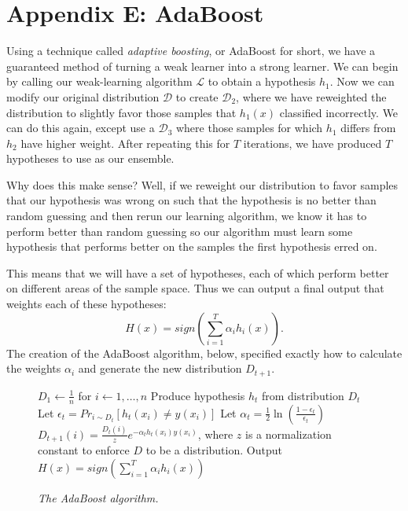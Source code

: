 \documentclass{article}
\newcommand{\LL}{\ensuremath{\mathcal{L}}}
\begin{document}
\section{Appendix E: AdaBoost}
Using a technique called \emph{adaptive boosting}, or AdaBoost for short, we
have a guaranteed method of turning a weak learner into a strong learner. We
can begin by calling our weak-learning algorithm $\LL$ to obtain a hypothesis
$h_1$. Now we can modify our original distribution $\mathcal{D}$ to create
$\mathcal{D}_2$, where we have reweighted the distribution to slightly favor
those samples that $h_1(x)$ classified incorrectly. We can do this again,
except use a $\mathcal{D}_3$ where those samples for which $h_1$ differs from
$h_2$ have higher weight. After repeating this for $T$ iterations, we have
produced $T$ hypotheses to use as our ensemble.

Why does this make sense? Well, if we reweight our distribution to favor samples
that our hypothesis was wrong on such that the hypothesis is no better than
random guessing and then rerun our learning algorithm, we know it has to perform
better than random guessing so our algorithm must learn some hypothesis that
performs better on the samples the first hypothesis erred on.

This means that we will have a set of hypotheses, each of which perform better
on different areas of the sample space. Thus we can output a final output that
weights each of these hypotheses:
\begin{equation*}
    H(x) = sign\left(\sum_{i = 1}^{T} \alpha_i h_i(x)\right).
\end{equation*}
The creation of the AdaBoost algorithm, below, specified exactly how to
calculate the weights $\alpha_i$ and generate the new distribution $D_{t+1}$.

\begin{figure}[H]
\begin{framed}
    \begin{algorithmic}
        \State $D_1 \leftarrow \frac{1}{n}$ for $i \leftarrow 1,\ldots, n$
            \State Produce hypothesis $h_t$ from distribution $D_t$
            \State Let $\epsilon_t = Pr_{i\sim D_t} [h_t(x_i) \neq y(x_i)]$
            \State Let $\alpha_t = \frac{1}{2}\ln\left(\frac{1 -
            \epsilon_t}{\epsilon_t}\right)$
            \State $D_{t+1}(i) = \frac{D_{t}(i)}{z}e^{-\alpha_t h_t(x_i)
            y(x_i)}$, where $z$ is a normalization
            \State constant to enforce $D$ to be a distribution.
            \EndFor
        \EndFor
        \State 
        \State Output $H(x) = sign\left(\sum_{i = 1}^{T} \alpha_i h_i(x)\right)$
    \end{algorithmic}
\end{framed}
\begin{center}
    \emph{The AdaBoost algorithm.}
\end{center}
\end{figure}
\end{document}
